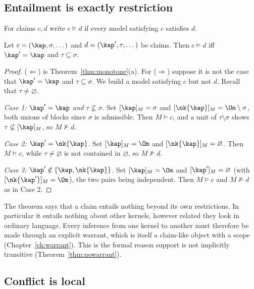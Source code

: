 \subsection{Entailment is exactly restriction}

\begin{definition}
For claims $c,d$ write $c\models d$ if every model satisfying $c$ satisfies $d$.
\end{definition}

\begin{theorem}\label{thm:entail}
Let $c=(\kap,\sigma,\dots)$ and $d=(\kap',\tau,\dots)$ be claims. Then $c\models d$ iff $\kap'=\kap$ and $\tau\subseteq\sigma$.
\end{theorem}

\begin{proof}
($\Leftarrow$) is Theorem~\ref{thm:monotone}(a). For ($\Rightarrow$) suppose it is not the case that $\kap'=\kap$ and $\tau\subseteq\sigma$. We build a model satisfying $c$ but not $d$. Recall that $\tau\ne\varnothing$.

\emph{Case 1: $\kap'=\kap$ and $\tau\not\subseteq\sigma$.} Set $[\kap]_M=\sigma$ and $[\nk{\kap}]_M=\Om\setminus\sigma$, both unions of blocks since $\sigma$ is admissible. Then $M\models c$, and a unit of $\tau\setminus\sigma$ shows $\tau\not\subseteq[\kap]_M$, so $M\not\models d$.

\emph{Case 2: $\kap'=\nk{\kap}$.} Set $[\kap]_M=\Om$ and $[\nk{\kap}]_M=\varnothing$. Then $M\models c$, while $\tau\ne\varnothing$ is not contained in $\varnothing$, so $M\not\models d$.

\emph{Case 3: $\kap'\notin\{\kap,\nk{\kap}\}$.} Set $[\kap]_M=\Om$ and $[\kap']_M=\varnothing$ (with $[\nk{\kap'}]_M=\Om$), the two pairs being independent. Then $M\models c$ and $M\not\models d$ as in Case 2.
\end{proof}

The theorem says that a claim entails nothing beyond its own restrictions. In particular it entails nothing about other kernels, however related they look in ordinary language. Every inference from one kernel to another must therefore be made through an explicit warrant, which is itself a claim-like object with a scope (Chapter~\ref{ch:warrant}). This is the formal reason support is not implicitly transitive (Theorem~\ref{thm:nowarrant}).

\subsection{Conflict is local}


